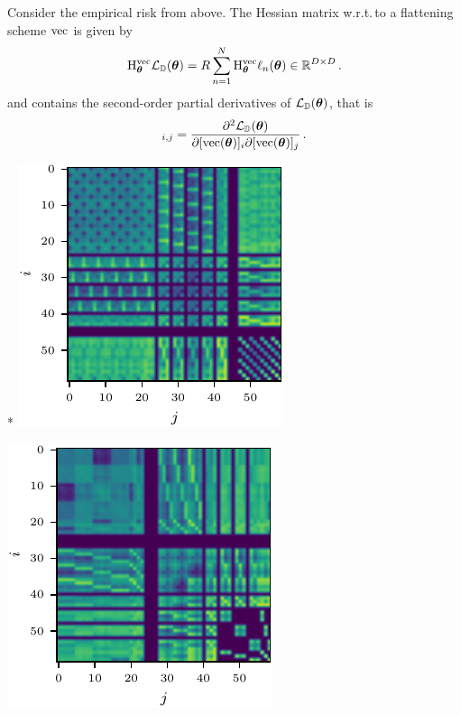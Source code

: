 Consider the empirical risk from above. The Hessian matrix w.r.t.\,to a flattening scheme $\vec$ is given by
\begin{align*}
  \hess_{\vtheta}^{\vec} \gL_{\sD}(\vtheta)
  =
  R
  \sum_{n=1}^N
  \hess_{\vtheta}^{\vec} \ell_n(\vtheta) \in \sR^{D \times D}\,.
\end{align*}
and contains the second-order partial derivatives of $\gL_{\sD}(\vtheta)$, that is
\begin{align*}
  [\hess_{\vtheta}^{\vec} \gL_{\sD}(\vtheta)]_{i,j}
  =
  \frac{\partial^2 \gL_{\sD}(\vtheta)}{\partial [\vec(\vtheta)]_i \partial [\vec(\vtheta)]_j}\,.
\end{align*}

\switchcolumn[1]*
\includegraphics{../kfs/plots/synthetic_cvec_hessian.pdf}

\includegraphics{../kfs/plots/synthetic_rvec_hessian.pdf}
\switchcolumn[0]

